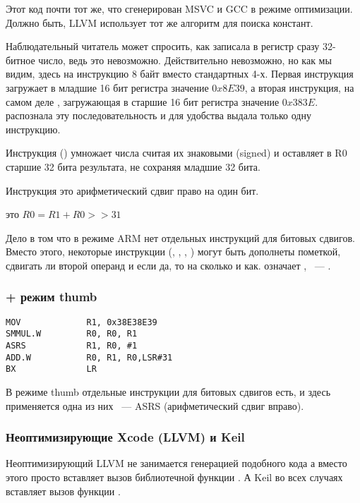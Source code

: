 Этот код почти тот же, что сгенерирован MSVC и GCC в режиме оптимизации. Должно быть, LLVM использует тот же
алгоритм для поиска констант.

Наблюдательный читатель может спросить, как \MOV записала в регистр сразу 32-битное число, ведь это невозможно.
Действительно невозможно, но как мы видим, здесь на инструкцию 8 байт вместо стандартных 4-х.
Первая инструкция загружает в младшие 16 бит регистра значение $0x8E39$, а вторая инструкция, 
на самом деле ,
загружающая в старшие 16 бит регистра значение $0x383E$. \IDA распознала эту последовательность и для удобства
выдала только одну инструкцию.

Инструкция  () умножает числа считая их знаковыми (signed)
и оставляет в R0 старшие 32 бита результата, не сохраняя младшие 32 бита.

Инструкция  это арифметический сдвиг право на один бит.

 это $R0=R1 + R0>>31$

Дело в том что в режиме ARM нет отдельных инструкций для битовых сдвигов. 
Вместо этого, некоторые инструкции (\MOV, \ADD,
\SUB, ) могут быть
дополнеты пометкой, сдвигать ли второй операнд и если да, то на сколько и как. 
 означает ,  ~--- .

\subsubsection{\OptimizingXcode + режим thumb}

\begin{lstlisting}
MOV             R1, 0x38E38E39
SMMUL.W         R0, R0, R1
ASRS            R1, R0, #1
ADD.W           R0, R1, R0,LSR#31
BX              LR
\end{lstlisting}

В режиме thumb отдельные инструкции для битовых сдвигов есть, и здесь применяется одна из них ~--- ASRS 
(арифметический сдвиг вправо).

\subsubsection{Неоптимизирующие Xcode (LLVM) и Keil}

Неоптимизирующий LLVM не занимается генерацией подобного кода а вместо этого просто вставляет вызов
библиотечной функции . А Keil во всех случаях вставляет вызов функции .

